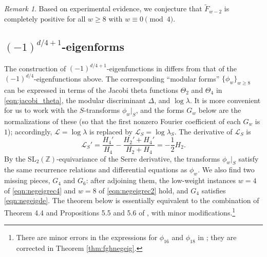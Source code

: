 \documentclass[10pt,reqno]{amsproc}
\newcommand{\cL}{\mathcal{L}}
\newcommand{\1}{\mathds{1}}	%
\theoremstyle{definition}
\theoremstyle{remark}
\newtheorem{remark}[theorem]{Remark}
\begin{document}
\begin{remark}
    Based on experimental evidence, we conjecture that $\widetilde{F}_{w-2}$ is completely positive for all $w \geq 8$ with $w \equiv 0 \pmod{4}$.
\end{remark}


\subsection{$(-1)^{d/4 + 1}$-eigenforms}
\label{subsec:fgh_negeig}

The construction of $(-1)^{d/4 + 1}$-eigenfunctions in \cite{feigenbaum2021eigenfunctions} differs from that of the $(-1)^{d/4}$-eigenfunctions above.
The corresponding ``modular forms'' $\{\phi_w\}_{w \geq 8}$ can be expressed in terms of the Jacobi theta functions $\Theta_2$ and $\Theta_4$ in \eqref{eqn:jacobi_theta}, the modular discriminant $\Delta$, and $\log\lambda$.
It is more convenient for us to work with the $S$-transforms $\phi_w|_S$, and the forms $G_w$ below are the normalizations of these (so that the first nonzero Fourier coefficient of each $G_w$ is $1$); accordingly, $\cL = \log \lambda$ is replaced by $\cL_S = \log \lambda_S$.
The derivative of $\cL_S$ is \cite[Appendix]{feigenbaum2021eigenfunctions}
\begin{equation}
    \label{eqn:LS_derivative}
    \cL_S' = \frac{H_4'}{H_4} - \frac{H_2' + H_4'}{H_2 + H_4} = -\frac{1}{2} H_2.
\end{equation}
By the $\mathrm{SL}_2(\mathbb{Z})$-equivariance of the Serre derivative, the transforms $\phi_w|_S$ satisfy the same recurrence relations and differential equations as $\phi_w$.
We also find two missing pieces, $G_4$ and $G_6$: after adjoining them, the low-weight instances $w=4$ of \eqref{eqn:negeigrec4} and $w=8$ of \eqref{eqn:negeigrec2} hold, and $G_4$ satisfies \eqref{eqn:negeigde}.
The theorem below is essentially equivalent to the combination of Theorem 4.4 and Propositions 5.5 and 5.6 of \cite{feigenbaum2021eigenfunctions}, with minor modifications.\footnote{There are minor errors in the expressions for $\phi_{16}$ and $\phi_{18}$ in \cite{feigenbaum2021eigenfunctions}; they are corrected in Theorem \ref{thm:fghnegeig}.}
\end{document}
